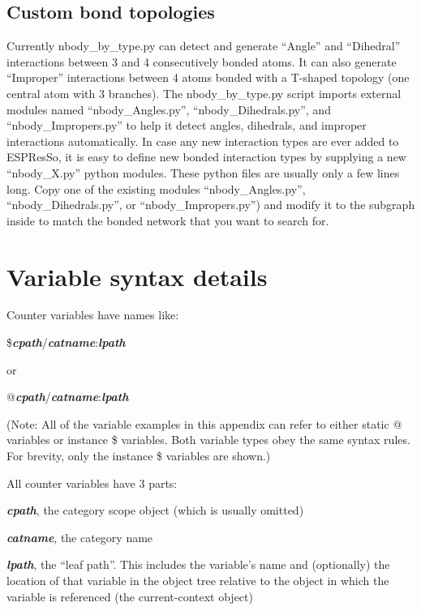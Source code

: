 \documentclass[11pt]{article}
\begin{document}
\subsection{Custom bond topologies}
\label{sec:nbody_by_type_custom}
  Currently nbody\_by\_type.py can detect and generate ``Angle'' 
and ``Dihedral'' interactions between 3 and 4 consecutively bonded atoms. 
It can also generate ``Improper'' interactions between 4 atoms bonded 
with a T-shaped topology (one central atom with 3 branches). 
The nbody\_by\_type.py script imports external modules named 
``nbody\_Angles.py'', ``nbody\_Dihedrals.py'', and ``nbody\_Impropers.py'' 
to help it detect angles, dihedrals, and improper interactions automatically.
In case any new interaction types are ever added to ESPResSo, 
it is easy to define new bonded interaction types by supplying 
a new ``nbody\_X.py'' python modules. 
These python files are usually only a few lines long. 
Copy one of the existing modules 
``nbody\_Angles.py'', ``nbody\_Dihedrals.py'', or ``nbody\_Impropers.py'') 
and modify it to the subgraph inside to match the bonded network 
that you want to search for.





\section{Variable syntax details}
\label{sec:adv_variable_syntax}

Counter variables have names like:

\$\textit{\textbf{cpath}}/\textit{\textbf{catname}}:\textit{\textbf{lpath}}

or

@\textit{\textbf{cpath}}/\textit{\textbf{catname}}:\textit{\textbf{lpath}}

(Note: All of the variable examples in this appendix can refer to either 
static @ variables or instance \$ variables.  Both variable types obey the
same syntax rules.  For brevity, only the instance \$ variables are shown.)

All counter variables have 3 parts: 

\begin{list}{}
\item
\textit{\textbf{cpath}}, the category scope object (which is usually omitted)
\item
\textit{\textbf{catname}}, the category name
\item
\textit{\textbf{lpath}}, the ``leaf path''. 
               This includes the variable's name and (optionally) 
               the location of that variable in the object tree relative 
               to the object in which the variable is referenced
               (the current-context object)
\item
\end{list}
\end{document}
